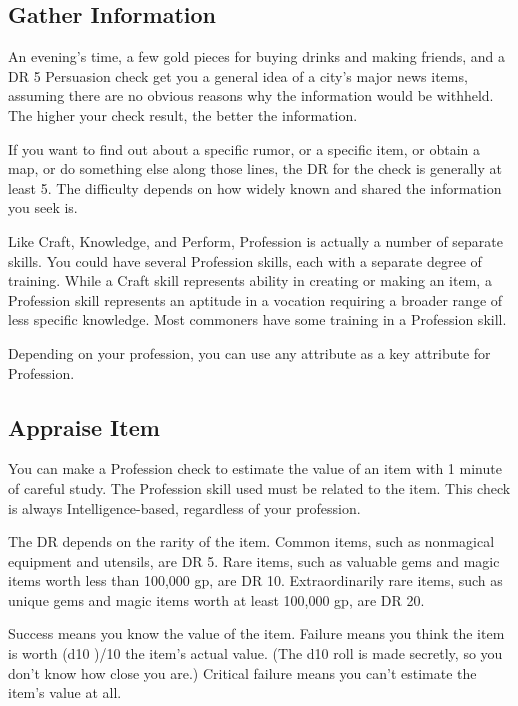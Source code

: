     \subsection{Gather Information}
        An evening's time, a few gold pieces for buying drinks and making friends, and a DR 5 Persuasion check get you a general idea of a city's major news items, assuming there are no obvious reasons why the information would be withheld. The higher your check result, the better the information.

        If you want to find out about a specific rumor, or a specific item, or obtain a map, or do something else along those lines, the DR for the check is generally at least 5.
        The difficulty depends on how widely known and shared the information you seek is.

\newpage
{}
        Like Craft, Knowledge, and Perform, Profession is actually a number of separate skills.
        You could have several Profession skills, each with a separate degree of training.
        While a Craft skill represents ability in creating or making an item, a Profession skill represents an aptitude in a vocation requiring a broader range of less specific knowledge.
        Most commoners have some training in a Profession skill.

        Depending on your profession, you can use any attribute as a key attribute for Profession.

    \subsection{Appraise Item}
        You can make a Profession check to estimate the value of an item with 1 minute of careful study. The Profession skill used must be related to the item.
        This check is always Intelligence-based, regardless of your profession.

        The DR depends on the rarity of the item. Common items, such as nonmagical equipment and utensils, are DR 5. Rare items, such as valuable gems and magic items worth less than 100,000 gp, are DR 10. Extraordinarily rare items, such as unique gems and magic items worth at least 100,000 gp, are DR 20.

        Success means you know the value of the item. Failure means you think the item is worth (d10 )/10 \x the item's actual value. (The d10 roll is made secretly, so you don't know how close you are.) Critical failure means you can't estimate the item's value at all.


